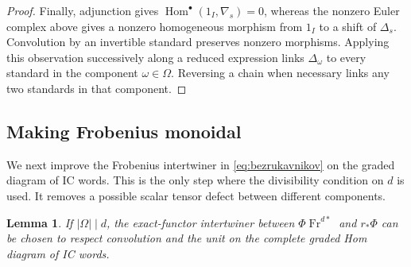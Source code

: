 \documentclass[11pt]{article}
\numberwithin{equation}{section}
\newtheorem{lemma}[theorem]{Lemma}
\theoremstyle{definition}
\theoremstyle{remark}
\newcommand{\Fr}{\operatorname{Fr}}
\newcommand{\Hom}{\operatorname{Hom}}
\begin{document}
\begin{proof}
Finally, adjunction gives
$\Hom^\bullet(1_I,\nabla_s)=0$, whereas the nonzero Euler complex
above gives a nonzero homogeneous morphism from $1_I$ to a shift of
$\Delta_s$.  Convolution by an invertible standard preserves
nonzero morphisms.  Applying this observation successively along a
reduced expression links $\Delta_\omega$ to every standard in the
component $\omega\in\Omega$.  Reversing a chain when necessary
links any two standards in that component.
\end{proof}

\subsection{Making Frobenius monoidal}

We next improve the Frobenius intertwiner in
\eqref{eq:bezrukavnikov} on the graded diagram of IC words.
This is the only step where the divisibility condition on $d$ is
used.  It removes a possible scalar tensor defect between different
components.

\begin{lemma}\label{enh:monoidal-frobenius}
If $|\Omega|\mid d$, the exact-functor intertwiner between
$\Phi\Fr^{d*}$ and $r_*\Phi$ can be chosen to respect convolution
and the unit on the complete graded Hom diagram of IC words.
\end{lemma}
\end{document}
